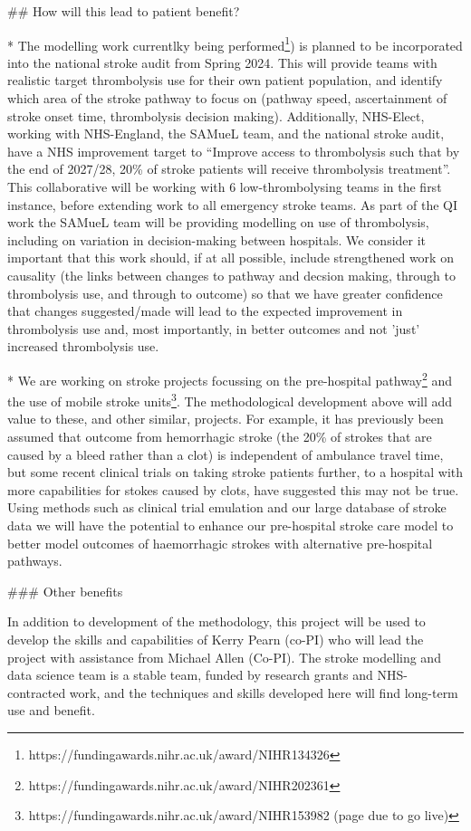 \begin{markdown}
## How will this lead to patient benefit?

* The modelling work currentlky being performed\footnote{https://fundingawards.nihr.ac.uk/award/NIHR134326}) is planned to be incorporated into the national stroke audit from Spring 2024. This will provide teams with realistic target thrombolysis use for their own patient population, and identify which area of the stroke pathway to focus on (pathway speed, ascertainment of stroke onset time, thrombolysis decision making). Additionally, NHS-Elect, working with NHS-England, the SAMueL team, and the national stroke audit, have a NHS improvement target to “Improve access to thrombolysis such that by the end of 2027/28, 20\% of stroke patients will receive thrombolysis treatment”. This collaborative will be working with 6 low-thrombolysing teams in the first instance, before extending work to all emergency stroke teams. As part of the QI work the SAMueL team will be providing modelling on use of thrombolysis, including on variation in decision-making between hospitals. We consider it important that this work should, if at all possible, include strengthened work on causality (the links between changes to pathway and decsion making, through to thrombolysis use, and through to outcome) so that we have greater confidence that changes suggested/made will lead to the expected improvement in thrombolysis use and, most importantly, in better outcomes and not 'just' increased thrombolysis use.

* We are working on stroke projects focussing on the pre-hospital pathway\footnote{https://fundingawards.nihr.ac.uk/award/NIHR202361} and the use of mobile stroke units\footnote{https://fundingawards.nihr.ac.uk/award/NIHR153982 (page due to go live)}. The methodological development above will add value to these, and other similar, projects. For example, it has previously been assumed that outcome from hemorrhagic stroke (the 20\% of strokes that are caused by a bleed rather than a clot) is independent of ambulance travel time, but some recent clinical trials on taking stroke patients further, to a hospital with more capabilities for stokes caused by clots, have suggested this may not be true. Using methods such as clinical trial emulation and our large database of stroke data we will have the potential to enhance our pre-hospital stroke care model to better model outcomes of haemorrhagic strokes with alternative pre-hospital pathways.

### Other benefits

In addition to development of the methodology, this project will be used to develop the skills and capabilities of Kerry Pearn (co-PI) who will lead the project with assistance from Michael Allen (Co-PI). The stroke modelling and data science team is a stable team, funded by research grants and NHS-contracted work, and the techniques and skills developed here will find long-term use and benefit.

\end{markdown}